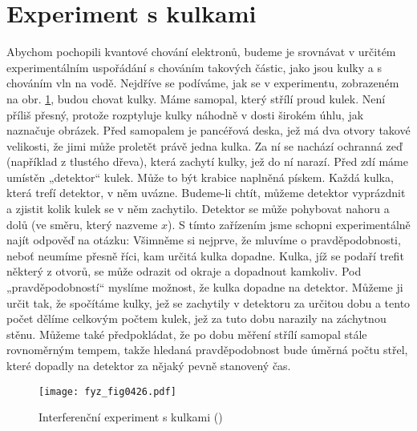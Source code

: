   \section{Experiment s kulkami}\label{fyz:IchapXXXVIIsecII}
    Abychom pochopili kvantové chování elektronů, budeme je srovnávat v určitém experimentálním
    uspořádání s chováním takových částic, jako jsou kulky a s chováním vln na vodě. Nejdříve se
    podíváme, jak se v experimentu, zobrazeném na obr. \ref{fyz:fig0426}, budou chovat kulky. Máme
    samopal, který střílí proud kulek. Není příliš přesný, protože rozptyluje kulky náhodně v dosti
    širokém úhlu, jak naznačuje obrázek. Před samopalem je pancéřová deska, jež má dva otvory takové
    velikosti, že jimi může proletět právě jedna kulka. Za ní se nachází ochranná zeď (například z
    tlustého dřeva), která zachytí kulky, jež do ní narazí. Před zdí máme umístěn „detektor“ kulek.
    Může to být krabice naplněná pískem. Každá kulka, která trefí detektor, v něm uvázne. Budeme-li
    chtít, můžeme detektor vyprázdnit a zjistit kolik kulek se v něm zachytilo. Detektor se může
    pohybovat nahoru a dolů (ve směru, který nazveme \(x\)). S tímto zařízením jsme schopni
    experimentálně najít odpověď na otázku:  Všimněme si
    nejprve, že mluvíme o pravděpodobnosti, neboť neumíme přesně říci, kam určitá kulka dopadne.
    Kulka, jíž se podaří trefit některý z otvorů, se může odrazit od okraje a dopadnout kamkoliv. Pod
    „pravděpodobností“ myslíme možnost, že kulka dopadne na detektor. Můžeme ji určit tak, že
    spočítáme kulky, jež se zachytily v detektoru za určitou dobu a tento počet dělíme celkovým
    počtem kulek, jež za tuto dobu narazily na záchytnou stěnu. Můžeme také předpokládat, že po dobu
    měření střílí samopal stále rovnoměrným tempem, takže hledaná pravděpodobnost bude úměrná počtu
    střel, které dopadly na detektor za nějaký pevně stanovený čas.
    
    \begin{figure}[ht!] %
      \centering
      \texttt{[image: fyz\_fig0426.pdf]}
      \caption{Interferenční experiment s kulkami (\cite[s.~697]{Feynman01})}
      \label{fyz:fig0426}
    \end{figure}

